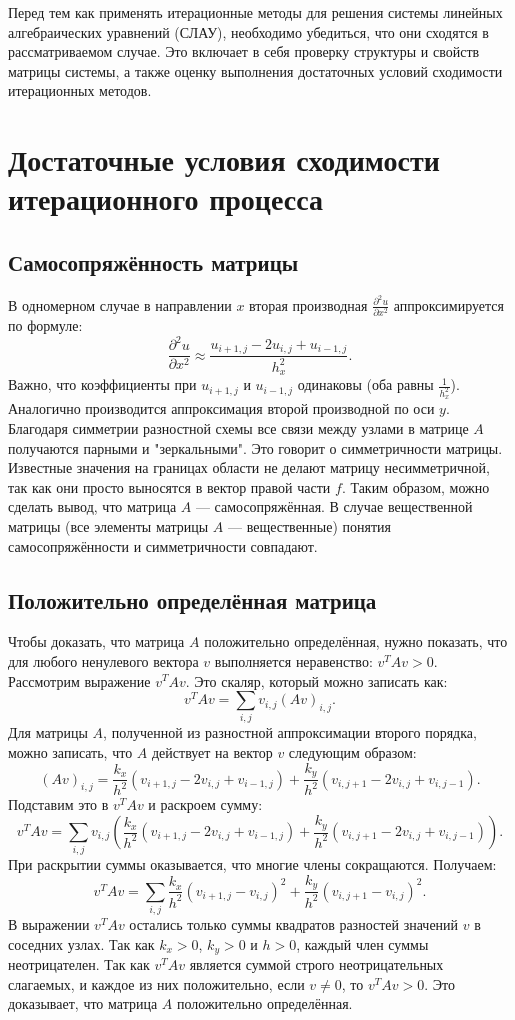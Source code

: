 \documentclass[a4paper, fleqn]{report}
\begin{document}
Перед тем как применять итерационные методы для решения системы линейных алгебраических уравнений (СЛАУ), необходимо убедиться, что они сходятся в рассматриваемом случае. Это включает в себя проверку структуры и свойств матрицы системы, а также оценку выполнения достаточных условий сходимости итерационных методов.

\section*{Достаточные условия сходимости итерационного процесса}

\subsection*{Самосопряжённость матрицы}
В одномерном случае в направлении $x$ вторая производная $\frac{\partial^2 u}{\partial x^2}$ аппроксимируется по формуле:
\[
\frac{\partial^2 u}{\partial x^2} \approx \frac{u_{i+1,j} - 2u_{i,j} + u_{i-1,j}}{h_x^2}.
\]
Важно, что коэффициенты при $u_{i+1,j}$ и $u_{i-1,j}$ одинаковы (оба равны $\frac{1}{h_x^2}$).  
Аналогично производится аппроксимация второй производной по оси $y$.
Благодаря симметрии разностной схемы все связи между узлами в матрице $A$ получаются парными и "зеркальными". Это говорит о симметричности матрицы. Известные значения на границах области не делают матрицу несимметричной, так как они просто выносятся в вектор правой части $f$. Таким образом, можно сделать вывод, что матрица $A$ — самосопряжённая. В случае вещественной матрицы (все элементы матрицы $A$ — вещественные) понятия самосопряжённости и симметричности совпадают.

\subsection*{Положительно определённая матрица}
Чтобы доказать, что матрица $A$ положительно определённая, нужно показать, что для любого ненулевого вектора $v$ выполняется неравенство: $v^T A v > 0$.
Рассмотрим выражение $v^T A v$. Это скаляр, который можно записать как:
\[
v^T A v = \sum_{i,j} v_{i,j} (Av)_{i,j}.
\]
Для матрицы $A$, полученной из разностной аппроксимации второго порядка, можно записать, что $A$ действует на вектор $v$ следующим образом:
\[
(Av)_{i,j} = \frac{k_x}{h^2}(v_{i+1,j} - 2v_{i,j} + v_{i-1,j}) + \frac{k_y}{h^2}(v_{i,j+1} - 2v_{i,j} + v_{i,j-1}).
\]
Подставим это в $v^T A v$ и раскроем сумму:
\[
v^T A v = \sum_{i,j} v_{i,j} \left( \frac{k_x}{h^2}(v_{i+1,j} - 2v_{i,j} + v_{i-1,j}) + \frac{k_y}{h^2}(v_{i,j+1} - 2v_{i,j} + v_{i,j-1}) \right).
\]
При раскрытии суммы оказывается, что многие члены сокращаются. Получаем:
\[
v^T A v = \sum_{i,j} \frac{k_x}{h^2} (v_{i+1,j} - v_{i,j})^2 + \frac{k_y}{h^2} (v_{i,j+1} - v_{i,j})^2.
\]
В выражении $v^T A v$ остались только суммы квадратов разностей значений $v$ в соседних узлах. Так как $k_x > 0$, $k_y > 0$ и $h > 0$, каждый член суммы неотрицателен. Так как $v^T A v$ является суммой строго неотрицательных слагаемых, и каждое из них положительно, если $v \neq 0$, то $v^T A v > 0$. Это доказывает, что матрица $A$ положительно определённая.
\end{document}
